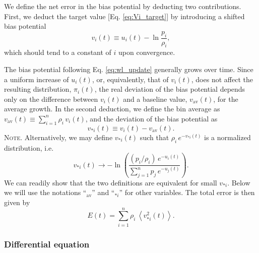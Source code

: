 \documentclass[reprint, superscriptaddress, floatfix]{revtex4-1}
\newcommand{\note}[1]{{\color{DarkGreen}\footnotesize \textsc{Note.} #1}}
\newcommand{\Err}{E}
\newcommand{\bav}[1]{#1_\mathrm{av}}
\begin{document}
We define the net error in the bias potential
by deducting two contributions.
%
First, we deduct the target value
[Eq. \eqref{eq:Vi_target}]
by introducing a shifted bias potential
%
\begin{equation}
  v_i(t)
  \equiv
  u_i(t)
  -
  \ln \frac { p_i }
            { \rho_i }
  ,
  \label{eq:v_def}
\end{equation}
%
which should tend to a constant of $i$
upon convergence.


The bias potential following Eq. \eqref{eq:wl_update}
generally grows over time.
%
Since a uniform increase of $u_i(t)$, or, equivalently, that of $v_i(t)$,
does not affect the resulting distribution, $\pi_i(t)$,
the real deviation of the bias potential
depends only on the difference between $v_i(t)$
and a baseline value, $\bav{v}(t)$,
for the average growth.\cite{
dama2014}
%
In the second deduction, we define
the bin average as $\bav{v}(t) \equiv \sum_{i=1}^n \rho_i \, v_i(t)$,
and the deviation of the bias potential as
%
\begin{equation}
  v_{*i}(t) \equiv v_i(t) - \bav{v}(t)
  .
\label{eq:x_def}
\end{equation}
%
\note{Alternatively,
  we may define $v_{*i}(t)$ such that
  $\rho_i \, e^{-v_{*i}(t)}$ is a normalized distribution,
  i.e.
  $$
  v_{*i}(t) \to -\ln\left(
    \frac{ (p_i/\rho_i) \, e^{ -u_i(t) } }
    { \sum_{j=1}^n p_j \, e^{ -u_j(t) } }
  \right).
  $$
  We can readily show that the two definitions are equivalent
  for small $v_{*i}$.}%
%
Below we will use the notations ``$\bav{}$'' and ``$_{*i}$''
for other variables.
%
The total error is then given by
%
\begin{equation}
  \Err(t)
  =
  \sum_{i = 1}^n \rho_i \,
  \left\langle v_{*i}^2(t) \right\rangle
  .
\label{eq:error_def}
\end{equation}




\subsubsection{\label{sec:sbin_diffeq}
Differential equation}
\end{document}
